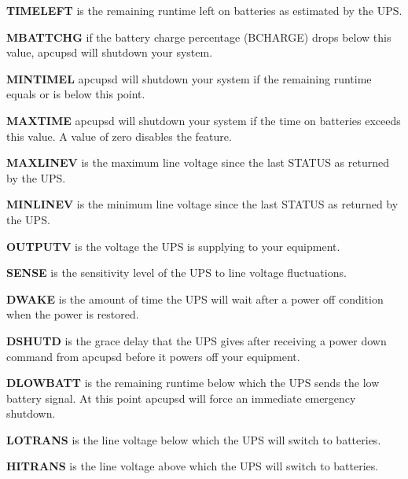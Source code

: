 \begin{description}
\item {\bf TIMELEFT}
is the remaining runtime left on batteries as estimated by the UPS.  

\item {\bf MBATTCHG}
if the battery charge percentage (BCHARGE) drops below this value, apcupsd
will shutdown your system.  

\item {\bf MINTIMEL}
apcupsd will shutdown your system if the remaining runtime equals or is below
this point.  

\item {\bf MAXTIME}
apcupsd will shutdown your system if the time on batteries exceeds this value.
A value of zero disables the feature.  

\item {\bf MAXLINEV}
is the maximum line voltage since the last STATUS as returned by the UPS.  

\item {\bf MINLINEV}
is the minimum line voltage since the last STATUS as returned by the UPS.  

\item {\bf OUTPUTV}
is the voltage the UPS is supplying to your equipment.  

\item {\bf SENSE}
is the sensitivity level of the UPS to line voltage fluctuations.  

\item {\bf DWAKE}
is the amount of time the UPS will wait after a power off condition when the
power is restored.  

\item {\bf DSHUTD}
is the grace delay that the UPS gives after receiving a power down command
from apcupsd before it powers off your equipment.  

\item {\bf DLOWBATT}
is the remaining runtime below which the UPS sends the low battery signal. At
this point apcupsd will force an immediate emergency shutdown.  

\item {\bf LOTRANS}
is the line voltage below which the UPS will switch to batteries.  

\item {\bf HITRANS}
is the line voltage above which the UPS will switch to batteries.  


\end{description}
